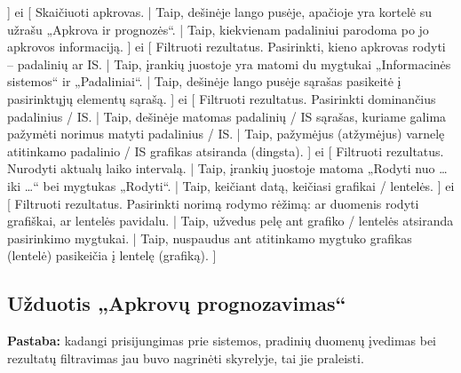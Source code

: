 {    ]
  ei [
    Skaičiuoti apkrovas. |
    Taip, dešinėje lango pusėje, apačioje yra kortelė su užrašu
    „Apkrova ir prognozės“. |
    Taip, kiekvienam padaliniui parodoma po jo apkrovos informaciją.
    ]
  ei [
    Filtruoti rezultatus. Pasirinkti, kieno apkrovas rodyti –
    padalinių ar IS. |
    Taip, įrankių juostoje yra matomi du mygtukai „Informacinės sistemos“
    ir „Padaliniai“. |
    Taip, dešinėje lango pusėje sąrašas pasikeitė į pasirinktųjų elementų
    sąrašą.
    ]
  ei [
    Filtruoti rezultatus. Pasirinkti dominančius padalinius / IS. |
    Taip, dešinėje matomas padalinių / IS sąrašas, kuriame galima pažymėti
    norimus matyti padalinius / IS. |
    Taip, pažymėjus (atžymėjus) varnelę atitinkamo padalinio / IS 
    grafikas atsiranda (dingsta).
    ]
  ei [
    Filtruoti rezultatus. Nurodyti aktualų laiko intervalą. |
    Taip, įrankių juostoje matoma „Rodyti nuo … iki …“ bei mygtukas
    „Rodyti“. |
    Taip, keičiant datą, keičiasi grafikai / lentelės.
    ]
  ei [
    Filtruoti rezultatus. Pasirinkti norimą rodymo rėžimą: ar
    duomenis rodyti grafiškai, ar lentelės pavidalu. |
    Taip, užvedus pelę ant grafiko / lentelės atsiranda pasirinkimo
    mygtukai. |
    Taip, nuspaudus ant atitinkamo mygtuko grafikas (lentelė) pasikeičia
    į lentelę (grafiką).
    ]
}

\subsection{Užduotis „Apkrovų prognozavimas“}

\label{sec:cw_apkrovu_prognozavimas}

\textbf{Pastaba:} kadangi prisijungimas prie sistemos, pradinių
duomenų įvedimas bei rezultatų filtravimas jau buvo nagrinėti
 skyrelyje, tai jie praleisti.


